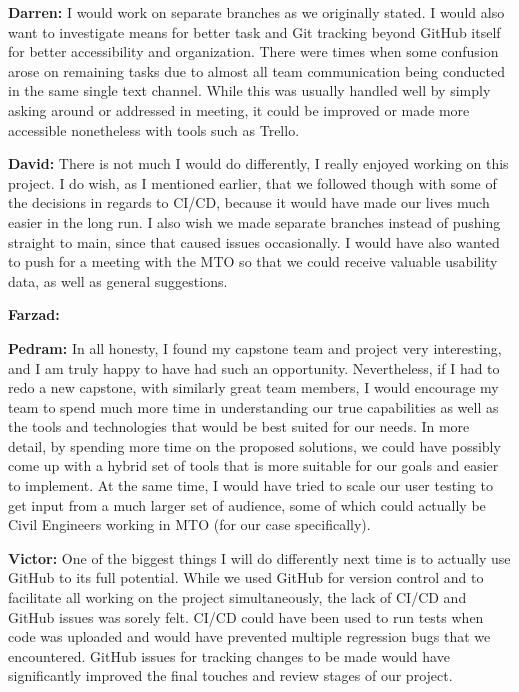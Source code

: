 \documentclass{article}
\begin{document}
\textbf{Darren:} I would work on separate branches as we originally stated. I would also want to investigate means for better task and Git tracking beyond GitHub itself for better accessibility and organization. There were times when some confusion arose on remaining tasks due to almost all team communication being conducted in the same single text channel. While this was usually handled well by simply asking around or addressed in meeting, it could be improved or made more accessible nonetheless with tools such as Trello.

\textbf{David:} There is not much I would do differently, I really enjoyed working on this project. I do wish, as I mentioned earlier, that we followed though with some of the decisions in regards to CI/CD, because it would have made our lives much easier in the long run. I also wish we made separate branches instead of pushing straight to main, since that caused issues occasionally. I would have also wanted to push for a meeting with the MTO so that we could receive valuable usability data, as well as general suggestions.

\textbf{Farzad:}

\textbf{Pedram:} In all honesty, I found my capstone team and project very interesting, and I am truly happy to have had such an opportunity. Nevertheless, if I had to redo a new capstone, with similarly great team members, I would encourage my team to spend much more time in understanding our true capabilities as well as the tools and technologies that would be best suited for our needs. In more detail, by spending more time on the proposed solutions, we could have possibly come up with a hybrid set of tools that is more suitable for our goals and easier to implement. At the same time, I would have tried to scale our user testing to get input from a much larger set of audience, some of which could actually be Civil Engineers working in MTO (for our case specifically). 

\textbf{Victor:} One of the biggest things I will do differently next time is to actually use GitHub to its full potential. While we used GitHub for version control and to 
facilitate all working on the project simultaneously, the lack of CI/CD and GitHub issues was sorely felt. CI/CD could have been used to run tests when code was uploaded and 
would have prevented multiple regression bugs that we encountered. GitHub issues for tracking changes to be made would have significantly improved the final touches and review 
stages of our project.
\end{document}
